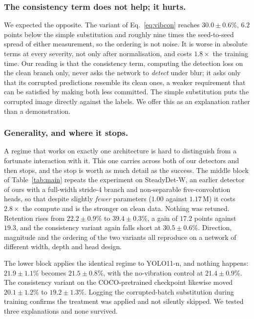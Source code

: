 \subsubsection{The consistency term does not help; it hurts.}
We expected the opposite. The variant of Eq.~\ref{eq:vibcon} reaches
$30.0 \pm 0.6\%$, $6.2$ points below the simple substitution and roughly nine times
the seed-to-seed spread of either measurement, so the ordering is not noise. It is
worse in absolute terms at every severity, not only after normalisation, and costs
$1.8\times$ the training time. Our reading is that the consistency term, computing
the detection loss on the clean branch only, never asks the network to \emph{detect}
under blur; it asks only that its corrupted predictions resemble its clean ones, a
weaker requirement that can be satisfied by making both less committed. The simple
substitution puts the corrupted image directly against the labels. We offer this as
an explanation rather than a demonstration.

\subsubsection{Generality, and where it stops.}
\label{sec:generality}
A regime that works on exactly one architecture is hard to distinguish from a
fortunate interaction with it. This one carries across both of our detectors and
then stops, and the stop is worth as much detail as the success. The middle block
of Table~\ref{tab:main} repeats the experiment on SteadyDet-W, an earlier detector
of ours with a full-width stride-4 branch and non-separable five-convolution heads,
so that despite slightly \emph{fewer} parameters ($1.00$ against $1.17$\,M) it
costs $2.8\times$ the compute and is the stronger on clean data. Nothing was
retuned. Retention rises from $22.2 \pm 0.9\%$ to
$39.4 \pm 0.3\%$, a gain of $17.2$ points against $19.3$, and the consistency
variant again falls short at $30.5 \pm 0.6\%$. Direction, magnitude and the
ordering of the two variants all reproduce on a network of different width, depth
and head design.

The lower block applies the identical regime to YOLO11-n, and nothing happens:
$21.9 \pm 1.1\%$ becomes $21.5 \pm 0.8\%$, with the no-vibration control at
$21.4 \pm 0.9\%$. The consistency variant on the COCO-pretrained checkpoint
likewise moved $20.1 \pm 1.2\%$ to $19.2 \pm 1.3\%$. Logging the corrupted-batch
substitution during training confirms the treatment was applied and not silently
skipped. We tested three explanations and none survived.

